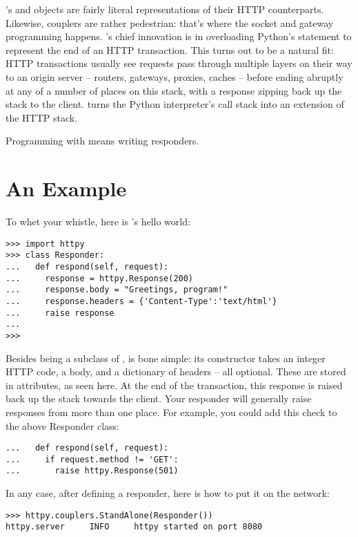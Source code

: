 's  and  objects are fairly literal
representations of their HTTP counterparts. Likewise, couplers are rather
pedestrian: that's where the socket and gateway programming happens.
's chief innovation is in overloading Python's 
statement to represent the end of an HTTP transaction. This turns out to be a
natural fit: HTTP transactions usually see requests pass through multiple layers
on their way to an origin server -- routers, gateways, proxies, caches -- before
ending abruptly at any of a number of places on this stack, with a response
zipping back up the stack to the client.  turns the Python
interpreter's call stack into an extension of the HTTP stack.

Programming with  means writing responders.



\section{An Example}

To whet your whistle, here is 's hello world:

\begin{verbatim}
>>> import httpy
>>> class Responder:
...   def respond(self, request):
...     response = httpy.Response(200)
...     response.body = "Greetings, program!"
...     response.headers = {'Content-Type':'text/html'}
...     raise response
...
>>>
\end{verbatim}

Besides being a subclass of ,  is
bone simple: its constructor takes an integer HTTP code, a body, and a
dictionary of headers -- all optional. These are stored in attributes, as seen
here. At the end of the transaction, this response is raised back up the stack
towards the client. Your responder will generally raise responses from more than
one place. For example, you could add this check to the above Responder class:

\begin{verbatim}
...   def respond(self, request):
...     if request.method != 'GET':
...       raise httpy.Response(501)
\end{verbatim}

In any case, after defining a responder, here is how to put it on the network:

\begin{verbatim}
>>> httpy.couplers.StandAlone(Responder())
httpy.server     INFO     httpy started on port 8080
\end{verbatim}

